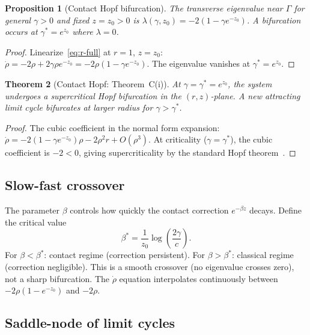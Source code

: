 \documentclass[reqno]{amsart}
\numberwithin{equation}{section}
\theoremstyle{plain}
\newtheorem{theorem}{Theorem}[section]
\newtheorem{proposition}[theorem]{Proposition}
\theoremstyle{definition}
\theoremstyle{remark}
\newcommand{\Orb}{\Gamma}
\begin{document}
\begin{proposition}[Contact Hopf bifurcation]\label{prop:hopf}
The transverse eigenvalue near $\Orb$ for general $\gamma>0$ and
fixed $z=z_0>0$ is $\lambda(\gamma,z_0)=-2(1-\gamma e^{-z_0})$.
A bifurcation occurs at $\gamma^*=e^{z_0}$ where $\lambda=0$.
\end{proposition}

\begin{proof}
Linearize~\eqref{eq:r-full} at $r=1$, $z=z_0$:
$\dot\rho=-2\rho+2\gamma\rho e^{-z_0}=-2\rho(1-\gamma e^{-z_0})$.
The eigenvalue vanishes at $\gamma^*=e^{z_0}$.
\end{proof}

\begin{theorem}[Contact Hopf: Theorem~C(i)]\label{thm:Chopf}
At $\gamma=\gamma^*=e^{z_0}$, the system undergoes a supercritical
Hopf bifurcation in the $(r,z)$-plane. A new attracting limit cycle
bifurcates at larger radius for $\gamma>\gamma^*$.
\end{theorem}
\begin{proof}
The cubic coefficient in the normal form expansion:
$\dot\rho=-2(1-\gamma e^{-z_0})\rho-2\rho^2 r+O(\rho^3)$.
At criticality ($\gamma=\gamma^*$), the cubic coefficient is $-2<0$,
giving supercriticality by the standard Hopf theorem~\cite{GH}.
\end{proof}

\subsection{Slow-fast crossover}

The parameter $\beta$ controls how quickly the contact correction
$e^{-\beta z}$ decays. Define the critical value
\[
  \beta^* = \frac{1}{z_0}\log\!\left(\frac{2\gamma}{c}\right).
\]
For $\beta<\beta^*$: contact regime (correction persistent).
For $\beta>\beta^*$: classical regime (correction negligible).
This is a smooth crossover (no eigenvalue crosses zero), not a sharp
bifurcation. The $\dot\rho$ equation interpolates continuously between
$-2\rho(1-e^{-z_0})$ and $-2\rho$.

\subsection{Saddle-node of limit cycles}
\end{document}
